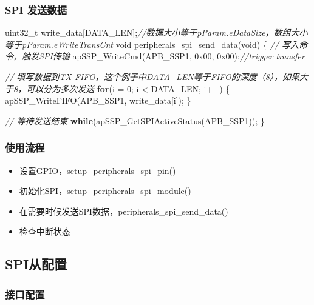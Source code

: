 \documentclass[
  12pt,
]{book}
\newenvironment{Shaded}{\begin{snugshade}}{\end{snugshade}}
\newcommand{\BaseNTok}[1]{\textcolor[rgb]{0.00,0.00,0.81}{#1}}
\newcommand{\CommentTok}[1]{\textcolor[rgb]{0.56,0.35,0.01}{\textit{#1}}}
\newcommand{\ControlFlowTok}[1]{\textcolor[rgb]{0.13,0.29,0.53}{\textbf{#1}}}
\newcommand{\DataTypeTok}[1]{\textcolor[rgb]{0.13,0.29,0.53}{#1}}
\newcommand{\DecValTok}[1]{\textcolor[rgb]{0.00,0.00,0.81}{#1}}
\newcommand{\NormalTok}[1]{#1}
\providecommand{\tightlist}{%
  \setlength{\itemsep}{0pt}\setlength{\parskip}{0pt}}
\begin{document}
\hypertarget{spi-ux53d1ux9001ux6570ux636e}{%
\subsubsection{SPI 发送数据}\label{spi-ux53d1ux9001ux6570ux636e}}

\begin{Shaded}
\begin{Highlighting}[]
\DataTypeTok{uint32_t}\NormalTok{ write_data[DATA_LEN];}\CommentTok{//数据大小等于pParam.eDataSize，数组大小等于pParam.eWriteTransCnt}
\DataTypeTok{void}\NormalTok{ peripherals_spi_send_data(}\DataTypeTok{void}\NormalTok{)}
\NormalTok{\{}
  \CommentTok{// 写入命令，触发SPI传输}
\NormalTok{  apSSP_WriteCmd(APB_SSP1, }\BaseNTok{0x00}\NormalTok{, }\BaseNTok{0x00}\NormalTok{);}\CommentTok{//trigger transfer}
  
  \CommentTok{// 填写数据到TX FIFO，这个例子中DATA_LEN等于FIFO的深度（8），如果大于8，可以分为多次发送}
  \ControlFlowTok{for}\NormalTok{(i = }\DecValTok{0}\NormalTok{; i < DATA_LEN; i++)}
\NormalTok{  \{}
\NormalTok{    apSSP_WriteFIFO(APB_SSP1, write_data[i]);}
\NormalTok{  \}}

  \CommentTok{// 等待发送结束}
  \ControlFlowTok{while}\NormalTok{(apSSP_GetSPIActiveStatus(APB_SSP1));}
\NormalTok{\}}
\end{Highlighting}
\end{Shaded}

\hypertarget{ux4f7fux7528ux6d41ux7a0b-10}{%
\subsubsection{使用流程}\label{ux4f7fux7528ux6d41ux7a0b-10}}

\begin{itemize}
\tightlist
\item
  设置GPIO，setup\_peripherals\_spi\_pin()
\item
  初始化SPI，setup\_peripherals\_spi\_module()
\item
  在需要时候发送SPI数据，peripherals\_spi\_send\_data()
\item
  检查中断状态
\end{itemize}

\hypertarget{spiux4eceux914dux7f6e}{%
\subsection{SPI从配置}\label{spiux4eceux914dux7f6e}}

\hypertarget{ux63a5ux53e3ux914dux7f6e-1}{%
\subsubsection{接口配置}\label{ux63a5ux53e3ux914dux7f6e-1}}
\end{document}
